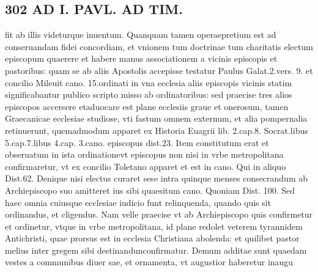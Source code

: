 \documentclass{article}
\begin{document}
\begin{pages}
\section*{302 AD I. PAVL. AD TIM. }\pstart fit ab illis videturque inuentum. Quanquam tamen operaepretium est ad conseruandam fidei concordiam, et vnionem tum doctrinae tum charitatis electum episcopum quaerere et habere manus associationem a vicinis episcopis et pastoribus: quam se ab aliis Apostolis accepisse testatur Paulus Galat.2.vers. 9. et concilio Mileuit cano. 15.ordinati in vna ecclesia aliis episcopis vicinis statim significabantur publico scripto misso ab ordinatoribus: sed praecise tres alios episcopos accersere etaduocare est plane ecclesiis graue et onerosum, tamen Graecanicae ecclesiae studiose, vti fastum omnem externum, et alia pompernalia retinuerunt, quemadmodum apparet ex Historia Euagrii lib. 2.cap.8. Socrat.libus 5.cap.7.libus 4.cap. 3.cano. episcopus dist.23. Item constitutum erat et obseruatum in ista ordinationevt episcopus non nisi in vrbe metropolitana confirmaretur, vt ex concilio Toletano apparet et est in cano. Qui in aliquo Dist.62. Denique nisi electus curaret sese intra quinque menses consecrandum ab Archiepiscopo suo amitteret ius sibi quaesitum cano. Quoniam Dist. 100. Sed haec omnia cuiusque ecclesiae iudicio funt relinquenda, quando quis sit ordinandus, et cligendus. Nam velle praecise vt ab Archiepiscopo quis confirmetur et ordinetur, vtque in vrbe metropolitana, id plane redolet veterem tyrannidem Antichristi, quae prorsus est in ecclesia Christiana abolenda: et quilibet pastor melius inter gregem sibi destinandunconfirmatur. Demum additae sunt quaedam vestes a communibus diuer sae, et ornamenta, vt augustior haberetur inaugu\pend

\end{pages}
\end{document}
